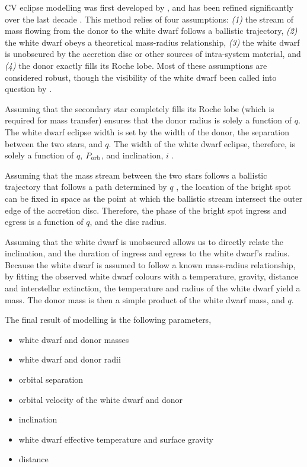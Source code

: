 CV eclipse modelling was first developed by \citet{wood1986}, and has been refined significantly over the last decade \citep{Savoury2011, McAllister2017, McAllister2019}. This method relies of four assumptions: \textit{(1)} the stream of mass flowing from the donor to the white dwarf follows a ballistic trajectory, \textit{(2)} the white dwarf obeys a theoretical mass-radius relationship, \textit{(3)} the white dwarf is unobscured by the accretion disc or other sources of intra-system material, and \textit{(4)} the donor exactly fills its Roche lobe. Most of these assumptions are considered robust, though the visibility of the white dwarf been called into question by \citet{Spark2015}.

Assuming that the secondary star completely fills its Roche lobe (which is required for mass transfer) ensures that the donor radius is solely a function of $q$. The white dwarf eclipse width is set by the width of the donor, the separation between the two stars, and $q$. The width of the white dwarf eclipse, therefore, is solely a function of $q$, $P_{\rm orb}$, and inclination, $i$ \citep{bailey1979}. 

Assuming that the mass stream between the two stars follows a ballistic trajectory that follows a path determined by $q$ \citep{Lubow1975}, the location of the bright spot can be fixed in space as the point at which the ballistic stream intersect the outer edge of the accretion disc. Therefore, the phase of the bright spot ingress and egress is a function of $q$, and the disc radius. 

Assuming that the white dwarf is unobscured allows us to directly relate the inclination, and the duration of ingress and egress to the white dwarf's radius. Because the white dwarf is assumed to follow a known mass-radius relationship, by fitting the observed white dwarf colours with a temperature, gravity, distance and interstellar extinction, the temperature and radius of the white dwarf yield a mass. The donor mass is then a simple product of the white dwarf mass, and $q$.

The final result of modelling is the following parameters,
\begin{itemize}
    \item white dwarf and donor masses
    \item white dwarf and donor radii
    \item orbital separation
    \item orbital velocity of the white dwarf and donor
    \item inclination
    \item white dwarf effective temperature and surface gravity
    \item distance
\end{itemize}

